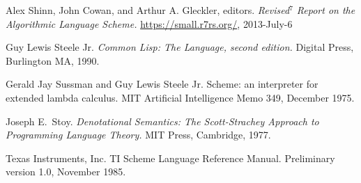 \begin{thebibliography}{999}
  Alex Shinn, John Cowan, and Arthur A. Gleckler, editors.
  {\em Revised$^7$ Report on the Algorithmic Language Scheme.}
  \url{https://small.r7rs.org/}, 2013-July-6

Guy Lewis Steele Jr.
{\em Common Lisp: The Language, second edition.}
Digital Press, Burlington MA, 1990.

Gerald Jay Sussman and Guy Lewis Steele Jr.
Scheme: an interpreter for extended lambda calculus.
MIT Artificial Intelligence Memo 349, December 1975.

Joseph E.~Stoy.
{\em Denotational Semantics: The Scott-Strachey Approach to
  Programming Language Theory.}
MIT Press, Cambridge, 1977.

Texas Instruments, Inc.
TI Scheme Language Reference Manual.
Preliminary version 1.0, November 1985. 



\end{thebibliography}
